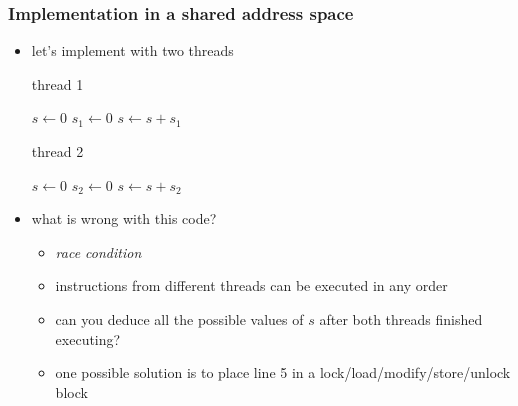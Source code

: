 \begin{frame}[fragile]
%
  \frametitle{Implementation in a shared address space}
%
  \begin{itemize}
%
  \item let's implement with two threads

    \vspace{.5em}
    \begin{minipage}{.40\linewidth}
      \begin{algorithm}[H]
%
        \footnotesize
        \dontprintsemicolon
        \nocaptionofalgo
        \setalcaphskip{0ex}
%
        \caption{\hspace{1em}thread 1}
        \vspace{.5em}
%
        $s \leftarrow 0$ \;
        $s_{1} \leftarrow 0$ \;
        $s \leftarrow s+s_{1}$ \;
%
        \vspace{.5em}
%
      \end{algorithm}
    \end{minipage}
%
    \hspace{.1\linewidth}
%
    \begin{minipage}{.40\linewidth}
      \begin{algorithm}[H]
%
        \footnotesize
        \dontprintsemicolon
        \nocaptionofalgo
        \setalcaphskip{0ex}
%
        \caption{\hspace{1em}thread 2}
        \vspace{.5em}
%
        $s \leftarrow 0$ \;
        $s_{2} \leftarrow 0$ \;
        $s \leftarrow s+s_{2}$ \;
%
        \vspace{.5em}
      \end{algorithm}
    \end{minipage}
    \vspace{.5em}
%
  \item what is wrong with this code? 
%
    \begin{itemize}
    \item {\em race condition}
    \item instructions from different threads can be executed in any order
    \item can you deduce all the possible values of $s$ after both threads finished executing?
    \item one possible solution is to place line 5 in a lock/load/modify/store/unlock block
    \end{itemize}
%
  \end{itemize}
%
\end{frame}

